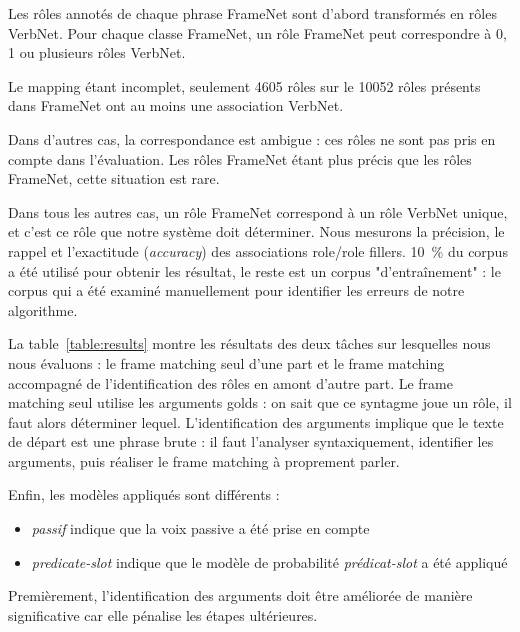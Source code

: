 Les rôles annotés de chaque phrase FrameNet sont d'abord transformés en rôles
VerbNet. Pour chaque classe FrameNet, un rôle FrameNet peut correspondre à 0, 1
ou plusieurs rôles VerbNet.

Le mapping étant incomplet, seulement 4605 rôles sur le 10052 rôles présents
dans FrameNet ont au moins une association VerbNet.

Dans d'autres cas, la correspondance est ambigue : ces rôles ne sont pas pris
en compte dans l'évaluation. Les rôles FrameNet étant plus précis que les rôles
FrameNet, cette situation est rare. %

Dans tous les autres cas, un rôle FrameNet correspond à un rôle VerbNet unique,
et c'est ce rôle que notre système doit déterminer. Nous mesurons la précision,
le rappel et l'exactitude (\emph{accuracy}) des associations role/role fillers.
10~\% du corpus a été utilisé pour obtenir les résultat, le reste est un corpus
"d'entraînement" : le corpus qui a été examiné manuellement pour identifier les
erreurs de notre algorithme.

La table~\ref{table:results} montre les résultats des deux tâches sur
lesquelles nous nous évaluons : le frame matching seul d'une part et le frame
matching accompagné de l'identification des rôles en amont d'autre part. Le
frame matching seul utilise les arguments golds : on sait que ce syntagme joue
un rôle, il faut alors déterminer lequel. L'identification des arguments
implique que le texte de départ est une phrase brute : il faut l'analyser
syntaxiquement, identifier les arguments, puis réaliser le frame matching à
proprement parler.

Enfin, les modèles appliqués sont différents :

\begin{itemize}

    \item \emph{passif} indique que la voix passive a été prise en compte

    \item \emph{predicate-slot} indique que le modèle de probabilité
    \emph{prédicat-slot} a été appliqué

\end{itemize}

Premièrement, l'identification des arguments doit être améliorée de manière
significative car elle pénalise les étapes ultérieures.

